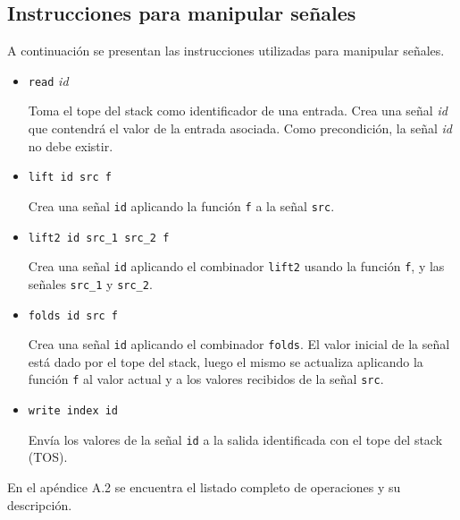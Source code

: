 \subsection{Instrucciones para manipular señales}
  
  A continuación se presentan las instrucciones utilizadas para manipular
señales.

\begin{itemize}

\item {
    \texttt{read} \textit{id}

      Toma el tope del stack como identificador de una entrada.
      Crea una señal \textit{id} que contendrá el valor de la entrada
    asociada. 
      Como precondición, la señal \textit{id} no debe existir.

    
}
\item {
    \texttt{lift id src f}

      Crea una señal \texttt{id} aplicando la función \texttt{f}
    a la señal \texttt{src}.
  
    
}
\item {
    \texttt{lift2 id src\_1 src\_2 f}

      Crea una señal \texttt{id} aplicando el combinador \texttt{lift2}
    usando la función \texttt{f}, y las señales \texttt{src\_1} y
    \texttt{src\_2}.

    
}
\item {
    \texttt{folds id src f}

      Crea una señal \texttt{id} aplicando el combinador \texttt{folds}.
    El valor inicial de la señal está dado por el tope del stack, luego
    el mismo se actualiza aplicando la función \texttt{f} al valor actual
    y a los valores recibidos de la señal \texttt{src}.

    
}
\item {
    \texttt{write index id}

      Envía los valores de la señal \texttt{id} a la salida identificada
    con el tope del stack (TOS).
    
    
}
\end{itemize}

  En el apéndice A.2 se encuentra el listado completo de operaciones y su
descripción.
